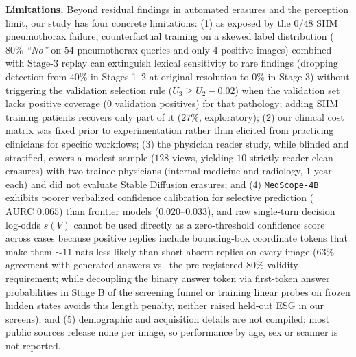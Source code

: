 \documentclass{article} %
\begin{document}
\textbf{Limitations.} Beyond residual findings in automated erasures and the perception limit, our study has four concrete limitations: (1) as exposed by the $0/48$ SIIM pneumothorax failure, counterfactual training on a skewed label distribution ($80\%$ \emph{``No''} on $54$ pneumothorax queries and only $4$ positive images) combined with Stage-3 replay can extinguish lexical sensitivity to rare findings (dropping detection from $40\%$ in Stages 1--2 at original resolution to $0\%$ in Stage 3) without triggering the validation selection rule ($U_3 \ge U_2 - 0.02$) when the validation set lacks positive coverage ($0$ validation positives) for that pathology; adding SIIM training patients recovers only part of it ($27\%$, exploratory); (2) our clinical cost matrix was fixed prior to experimentation rather than elicited from practicing clinicians for specific workflows; (3) the physician reader study, while blinded and stratified, covers a modest sample ($128$ views, yielding $10$ strictly reader-clean erasures) with two trainee physicians (internal medicine and radiology, $1\text{ year}$ each) and did not evaluate Stable Diffusion erasures; and (4) \texttt{MedScope-4B} exhibits poorer verbalized confidence calibration for selective prediction ($\text{AURC } 0.065$) than frontier models ($0.020\text{--}0.033$), and raw single-turn decision log-odds $s(V)$ cannot be used directly as a zero-threshold confidence score across cases because positive replies include bounding-box coordinate tokens that make them $\sim 11\text{ nats}$ less likely than short absent replies on every image ($63\%$ agreement with generated answers vs.\ the pre-registered $80\%$ validity requirement; while decoupling the binary answer token via first-token answer probabilities in Stage B of the screening funnel or training linear probes on frozen hidden states avoids this length penalty, neither raised held-out ESG in our screens); and (5) demographic and acquisition details are not compiled: most public sources release none per image, so performance by age, sex or scanner is not reported.
\end{document}
